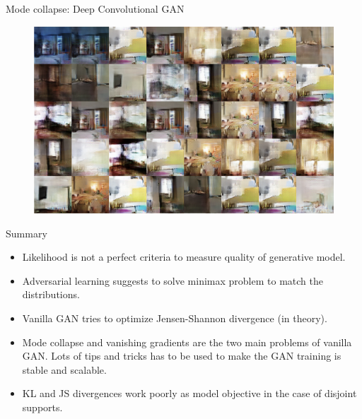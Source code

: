 \begin{frame}{Mode collapse: Deep Convolutional GAN}
	\begin{figure}
		\centering
		\includegraphics[width=\linewidth]{figs/mode_collapse_4}
	\end{figure}
\end{frame}
\begin{frame}{Summary}
	\begin{itemize}
		\item Likelihood is not a perfect criteria to measure quality of generative model.
		\vfill
		\item Adversarial learning suggests to solve minimax problem to match the distributions.
		\vfill
		\item Vanilla GAN tries to optimize Jensen-Shannon divergence (in theory).
		\vfill		
		\item Mode collapse and vanishing gradients are the two main problems of vanilla GAN.  Lots of tips and tricks has to be used to make the GAN training is stable and scalable.
		\vfill
		\item KL and JS divergences work poorly as model objective in the case of disjoint supports.
	\end{itemize}
\end{frame}
 